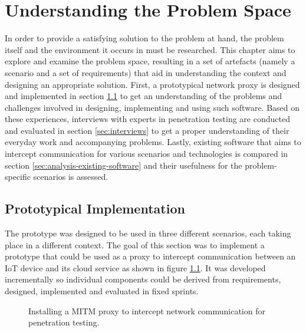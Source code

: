 \chapter{Understanding the Problem Space}
\label{chap:understanding-the-problem-space}
In order to provide a satisfying solution to the problem at hand, the problem itself and the environment it occurs in must be researched. This chapter aims to explore and examine the problem space, resulting in a set of artefacts (namely a scenario and a set of requirements) that aid in understanding the context and designing an appropriate solution. First, a prototypical network proxy is designed and implemented in section \ref{sec:prototypical-implementation} to get an understanding of the problems and challenges involved in designing, implementing and using such software. Based on these experiences, interviews with experts in penetration testing are conducted and evaluated in section \ref{sec:interviews} to get a proper understanding of their everyday work and accompanying problems. Lastly, existing software that aims to intercept communication for various scenarios and technologies is compared in section \ref{sec:analysis-existing-software} and their usefulness for the problem-specific scenarios is assessed.

\section{Prototypical Implementation}
\label{sec:prototypical-implementation}
The prototype was designed to be used in three different scenarios, each taking place in a different context. The goal of this section was to implement a prototype that could be used as a proxy to intercept communication between an \ac{IoT} device and its cloud service as shown in figure \ref{fig:network-communication-diagrams}. It was developed incrementally so individual components could be derived from requirements, designed, implemented and evaluated in fixed sprints.

\begin{figure}%
    \centering
    \qquad
    \caption{Installing a \ac{MITM} proxy to intercept network communication for penetration testing.}%
    \label{fig:network-communication-diagrams}%
\end{figure}

